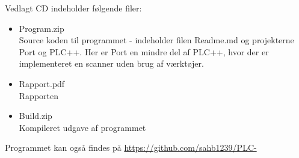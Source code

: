 Vedlagt CD indeholder følgende filer:

\begin{itemize}
    \item Program.zip\\Source koden til programmet - indeholder filen Readme.md og projekterne Port og PLC++. Her er Port en mindre del af PLC++, hvor der er implementeret en scanner uden brug af værktøjer.
    \item Rapport.pdf \\Rapporten
    \item Build.zip  \\Kompileret udgave af programmet
\end{itemize}

\noindent Programmet kan også findes på \url{https://github.com/sahb1239/PLC-}